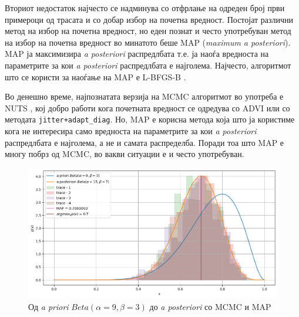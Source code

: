 \documentclass[12pt]{article}
\numberwithin{equation}{section}
\begin{document}
Вториот недостаток најчесто се надминува со отфрлање на одреден број први примероци од трасата и со добар избор на почетна вредност. Постојат различни метод на избор на почетна вредност, но еден познат и често употребуван метод на избор на почетна вредност во минатото беше MAP (\textit{maximum a posteriori}). MAP ја максимизира \textit{a posteriori} распредлбата т.е. ја наоѓа вредноста на параметрите за кои \textit{a posteriori} распредлбата е најголема. Најчесто, алгоритмот што се користи за наоѓање на MAP е L-BFGS-B \cite{byrd1995limited,zhu1997algorithm}.

Во денешно време, најпознатата верзија на MCMC алгоритмот во употреба е NUTS \cite{hoffman2014no}, кој добро работи кога почетната вредност се одредува со ADVI \cite{kucukelbir2017automatic} или со методата \verb|jitter+adapt_diag|. Но, MAP е корисна метода која што ја користиме кога не интересира само вредноста на параметрите за кои \textit{a posteriori} распредлбата е најголема, а не и самата распределба. Поради тоа што MAP е многу побрз од MCMC, во вакви ситуации е и често употребуван.

\begin{figure}[h]
    \centering
    \includegraphics[width=1\textwidth]{plots/beta_prior_to_posterior_mcmc.png}
    \caption{Од \textit{a priori} \(Beta(\alpha=9, \beta=3)\) до \textit{a posteriori} со MCMC и MAP}
    \label{fig:beta_prior_to_posterior_mcmc}
\end{figure}
\end{document}
